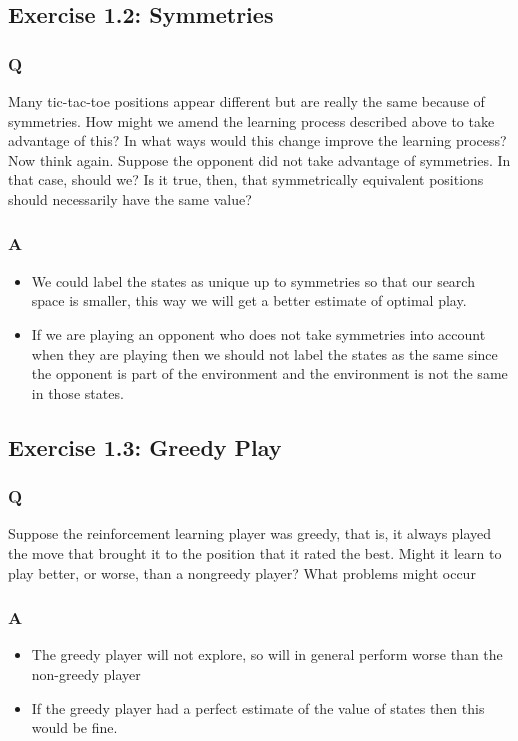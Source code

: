 \subsection{Exercise 1.2: Symmetries}
\subsubsection{Q}
Many tic-tac-toe positions appear different but are really the same because of symmetries. How might we amend the learning process described above to take advantage of this? In what ways would this change improve the learning process? Now think again. Suppose the opponent did not take advantage of symmetries. In that case, should we? Is it true, then, that symmetrically equivalent positions should necessarily have the same value?

\subsubsection{A}
\begin{itemize}
    \item We could label the states as unique up to symmetries so that our search space is smaller, this way we will get a better estimate of optimal play.
    \item If we are playing an opponent who does not take symmetries into account when they are playing then we should not label the states as the same since the opponent is part of the environment and the environment is not the same in those states.
\end{itemize}

\subsection{Exercise 1.3: Greedy Play}
\subsubsection{Q}
Suppose the reinforcement learning player was greedy, that is, it always played the move that brought it to the position that it rated the best. Might it learn to play better, or worse, than a nongreedy player? What problems might occur

\subsubsection{A}
\begin{itemize}
    \item The greedy player will not explore, so will in general perform worse than the non-greedy player
    \item If the greedy player had a perfect estimate of the value of states then this would be fine.
\end{itemize}

